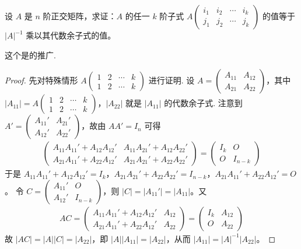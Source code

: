 \documentclass[../../main.tex]{subfiles}
\begin{document}
\begin{proposition}\label{proposition:例9.45}
设 \(A\) 是 \(n\) 阶正交矩阵，求证：\(A\) 的任一 \(k\) 阶子式 \(A\begin{pmatrix}
i_1 & i_2 & \cdots & i_k \\
j_1 & j_2 & \cdots & j_k
\end{pmatrix}\) 的值等于 \(\vert A\vert^{-1}\) 乘以其代数余子式的值。
\end{proposition}
\begin{remark}
这个是的推广.
\end{remark}
\begin{proof}
先对特殊情形 \(A\begin{pmatrix}
1 & 2 & \cdots & k \\
1 & 2 & \cdots & k
\end{pmatrix}\) 进行证明. 设 \(A = \begin{pmatrix}
A_{11} & A_{12} \\
A_{21} & A_{22}
\end{pmatrix}\)，其中 \(\vert A_{11}\vert = A\begin{pmatrix}
1 & 2 & \cdots & k \\
1 & 2 & \cdots & k
\end{pmatrix}\)，\(\vert A_{22}\vert\) 就是 \(\vert A_{11}\vert\) 的代数余子式. 注意到 \(A' = \begin{pmatrix}
A_{11}' & A_{21}' \\
A_{12}' & A_{22}'
\end{pmatrix}\)，故由 \(AA' = I_n\) 可得
\begin{align*}
\begin{pmatrix}
A_{11}A_{11}' + A_{12}A_{12}' & A_{11}A_{21}' + A_{12}A_{22}' \\
A_{21}A_{11}' + A_{22}A_{12}' & A_{21}A_{21}' + A_{22}A_{22}'
\end{pmatrix} = \begin{pmatrix}
I_k & O \\
O & I_{n - k}
\end{pmatrix}
\end{align*}
于是
\(A_{11}A_{11}' + A_{12}A_{12}' = I_k\)，\(A_{21}A_{21}' + A_{22}A_{22}' = I_{n - k}\)，\(A_{21}A_{11}' + A_{22}A_{12}' = O\)。
令 \(C = \begin{pmatrix}
A_{11}' & O \\
A_{12}' & I_{n - k}
\end{pmatrix}\)，则 \(\vert C\vert = \vert A_{11}'\vert = \vert A_{11}\vert\)。又
\begin{align*}
AC = \begin{pmatrix}
A_{11}A_{11}' + A_{12}A_{12}' & A_{12} \\
A_{21}A_{11}' + A_{22}A_{12}' & A_{22}
\end{pmatrix} = \begin{pmatrix}
I_k & A_{12} \\
O & A_{22}
\end{pmatrix}
\end{align*}
故 \(\vert AC\vert = \vert A\vert\vert C\vert = \vert A_{22}\vert\)，即 \(\vert A\vert\vert A_{11}\vert = \vert A_{22}\vert\)，从而 \(\vert A_{11}\vert = \vert A\vert^{-1}\vert A_{22}\vert\)。


\end{proof}
\end{document}
